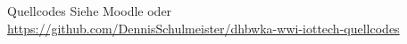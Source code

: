 \begin{frame}{Quellcodes}
    Siehe Moodle oder \\
    {
        \small
        \url{https://github.com/DennisSchulmeister/dhbwka-wwi-iottech-quellcodes}
    }

    \smallskip
    \setlength{\fboxsep}{0em}
\end{frame}

